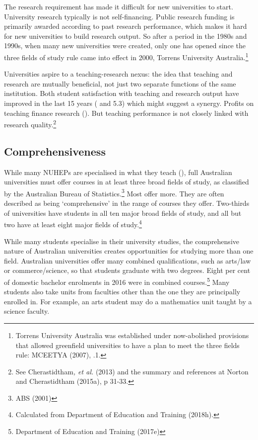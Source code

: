 \documentclass{grattan}
\begin{document}
The research requirement has made it difficult for new universities to start. University research typically is not self-financing. Public research funding is primarily awarded according to past research performance, which makes it hard for new universities to build research output. So after a period in the 1980s and 1990s, when many new universities were created, only one has opened since the three fields of study rule came into effect in 2000, Torrens University Australia.\footnote{Torrens University Australia was established under now-abolished provisions that allowed greenfield universities to have a plan to meet the three fields rule: MCEETYA (2007), .1.}

Universities aspire to a teaching-research nexus: the idea that teaching and research are mutually beneficial, not just two separate functions of the same institution. Both student satisfaction with teaching and research output have improved in the last 15 years ( and 5.3) which might suggest a synergy. Profits on teaching finance research (). But teaching performance is not closely linked with research quality.\footnote{See Cherastidtham\emph{, et al.} (2013) and the summary and references at Norton and Cherastidtham (2015a), p 31-33.}

%
\subsection{Comprehensiveness}\label{subsec:comprehensiveness}

While many NUHEPs are specialised in what they teach (), full Australian universities must offer courses in at least three broad fields of study, as classified by the Australian Bureau of Statistics.\footnote{ABS (2001)} Most offer more. They are often described as being `comprehensive' in the range of courses they offer. Two-thirds of universities have students in all ten major broad fields of study, and all but two have at least eight major fields of study.\footnote{Calculated from Department of Education and Training (2018h).}

While many students specialise in their university studies, the comprehensive nature of Australian universities creates opportunities for studying more than one field. Australian universities offer many combined qualifications, such as arts/law or commerce/science, so that students graduate with two degrees. Eight per cent of domestic bachelor enrolments in 2016 were in combined courses.\footnote{Department of Education and Training (2017e)} Many students also take units from faculties other than the one they are principally enrolled in. For example, an arts student may do a mathematics unit taught by a science faculty.
\end{document}
